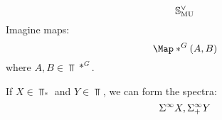 \documentclass{amsart}
\begin{document}
$$ \S\compl[\MU] $$
Imagine maps:
$$ \Map*^G(A, B) $$
where $ A, B \in \Top*^G $.

If $ X \in \Top_* $ and $ Y \in \Top $, we can form the spectra:
$$ \Suspinf X, \Suspinf+ Y $$
\end{document}
